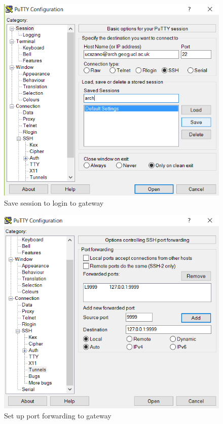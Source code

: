 \documentclass[a4paper]{article}
\begin{document}
\begin{figure}[p]
  \centering
    \includegraphics[width=\textwidth]{figures/putty1_save_login_session.png}
  \caption{Save session to login to gateway}
  \label{fig:putty1}
\end{figure}

\begin{figure}[p]
  \centering
    \includegraphics[width=\textwidth]{figures/putty2_setup_tunnel.png}
  \caption{Set up port forwarding to gateway}
  \label{fig:putty2}
\end{figure}
\end{document}

